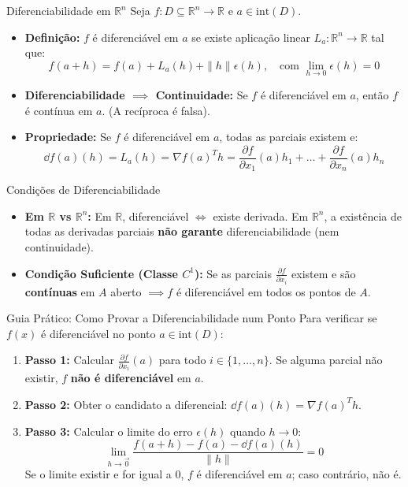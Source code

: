 \documentclass[11pt,a4paper]{article}
\newcommand{\R}{\mathbb{R}}
\begin{document}
\noindent\begin{definitionbox}{Diferenciabilidade em $\R^n$}
  Seja $f : D \subseteq \R^n \to \R$ e $a \in \text{int}(D)$.
  \begin{itemize}
    \item \textbf{Definição:} $f$ é diferenciável em $a$ se existe aplicação linear $L_a : \R^n \to \R$ tal que:
      \[ f(a+h) = f(a) + L_a(h) + \|h\|\epsilon(h), \quad \text{com } \lim_{h\to 0}\epsilon(h) = 0 \]
    \item \textbf{Diferenciabilidade $\implies$ Continuidade:} Se $f$ é diferenciável em $a$, então $f$ é contínua em $a$. (A recíproca é falsa).
    \item \textbf{Propriedade:} Se $f$ é diferenciável em $a$, todas as parciais existem e:
      \[ \dd f(a)(h) = L_a(h) = \nabla f(a)^T h = \frac{\partial f}{\partial x_1}(a)h_1 + \dots + \frac{\partial f}{\partial x_n}(a)h_n \]
  \end{itemize}
\end{definitionbox}

\noindent\begin{theorembox}{Condições de Diferenciabilidade}
  \begin{itemize}
    \item \textbf{Em $\R$ vs $\R^n$:} Em $\R$, diferenciável $\iff$ existe derivada. Em $\R^n$, a existência de todas as derivadas parciais \textbf{não garante} diferenciabilidade (nem continuidade).
    \item \textbf{Condição Suficiente (Classe $C^1$):} Se as parciais $\frac{\partial f}{\partial x_i}$ existem e são \textbf{contínuas} em $A$ aberto $\implies f$ é diferenciável em todos os pontos de $A$.
  \end{itemize}
\end{theorembox}

\noindent\begin{formulabox}{Guia Prático: Como Provar a Diferenciabilidade num Ponto}
  Para verificar se $f(x)$ é diferenciável no ponto $a \in \text{int}(D)$:
  \begin{enumerate}
    \item \textbf{Passo 1:} Calcular $\frac{\partial f}{\partial x_i}(a)$ para todo $i \in \{1,\dots,n\}$. Se alguma parcial não existir, $f$ \textbf{não é diferenciável} em $a$.
    \item \textbf{Passo 2:} Obter o candidato a diferencial: $\dd f(a)(h) = \nabla f(a)^T h$.
    \item \textbf{Passo 3:} Calcular o limite do erro $\epsilon(h)$ quando $h \to 0$:
      \[ \lim_{h \to \vec{0}} \frac{f(a+h) - f(a) - \dd f(a)(h)}{\|h\|} = 0 \]
      Se o limite existir e for igual a 0, $f$ é diferenciável em $a$; caso contrário, não é.
  \end{enumerate}
\end{formulabox}
\end{document}
